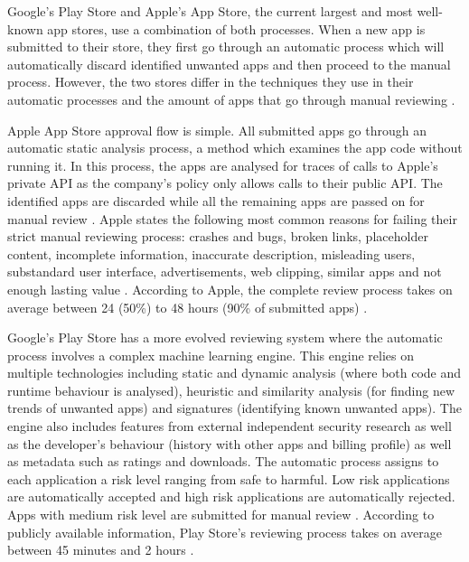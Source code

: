 Google's Play Store and Apple's App Store, the current largest and most well-known app stores, use a combination of both processes. When a new app is submitted to their store, they first go through an automatic process which will automatically discard identified unwanted apps and then proceed to the manual process. However, the two stores differ in the techniques they use in their automatic processes and the amount of apps that go through manual reviewing \cite{AppleInsiderWebsite, AndroidWhitePaper}.

Apple App Store approval flow is simple. All submitted apps go through an automatic static analysis process, a method which examines the app code without running it. In this process, the apps are analysed for traces of calls to Apple's private API as the company's policy only allows calls to their public API. The identified apps are discarded while all the remaining apps are passed on for manual review \cite{AppleInsiderWebsite, AppleApprovalFortune}. Apple states the following most common reasons for failing their strict manual reviewing process: crashes and bugs, broken links, placeholder content, incomplete information, inaccurate description, misleading users, substandard user interface, advertisements, web clipping, similar apps and not enough lasting value \cite{AppleReviewRejections}. According to Apple, the complete review process takes on average between 24 (50\%) to 48 hours (90\% of submitted apps) \cite{AppleReviewTime}. 

Google's Play Store has a more evolved reviewing system where the automatic process involves a complex machine learning engine. This engine relies on multiple technologies including static and dynamic analysis (where both code and runtime behaviour is analysed), heuristic and similarity analysis (for finding new trends of unwanted apps) and signatures (identifying known unwanted apps). The engine also includes features from external independent security research as well as the developer's behaviour (history with other apps and billing profile) as well as metadata such as ratings and downloads. The automatic process assigns to each application a risk level ranging from safe to harmful. Low risk applications are automatically accepted and high risk applications are automatically rejected. Apps with medium risk level are submitted for manual review \cite{AndroidWhitePaper}. According to publicly available information, Play Store's reviewing process takes on average between 45 minutes and 2 hours \cite{AndroidReviewTime}.

